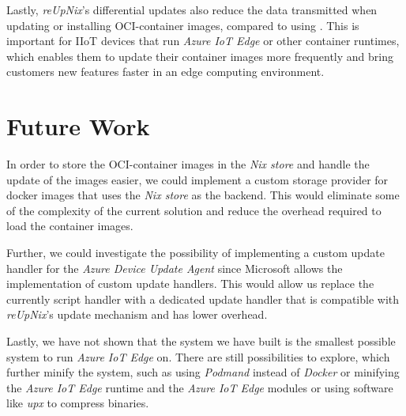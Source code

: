 Lastly, \textit{reUpNix}'s differential updates also reduce the data transmitted
when updating or installing \ac{OCI}-container images, compared to using .
This is important for \ac{IIoT} devices that run \textit{Azure IoT Edge} or other
container runtimes, which enables them to update their container images more frequently
and bring customers new features faster in an edge computing environment.


\section{Future Work}
In order to store the \ac{OCI}-container images in the \textit{Nix store} and
handle the update of the images easier, we could implement a custom storage
provider for docker images that uses the \textit{Nix store} as the backend.
This would eliminate some of the complexity of the current solution and reduce
the overhead required to load the container images.

Further, we could investigate the possibility of implementing a custom update
handler for the \textit{Azure Device Update Agent} since Microsoft allows
the implementation of custom update handlers. This would allow us replace the
currently script handler with a dedicated update handler that is compatible
with \textit{reUpNix}'s update mechanism and has lower overhead.

Lastly, we have not shown that the system we have built is the smallest possible
system to run \textit{Azure IoT Edge} on. There are still possibilities to explore, which
further minify the system, such as using \textit{Podmand} instead of \textit{Docker}
or minifying the \textit{Azure IoT Edge} runtime and the \textit{Azure IoT Edge} modules
or using software like \textit{upx} to compress binaries.
